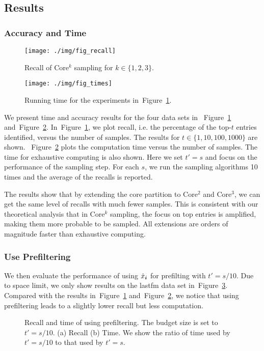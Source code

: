 \documentclass[letterpaper]{article}
\newcommand{\V}[1]{{\boldsymbol{{\MakeLowercase{#1}}}}}
\newcommand{\predx}{\hat{x}_{\V{i}}}
\newcommand{\Fig}[1]{Figure~\ref{fig:#1}}
\begin{document}
\subsection{Results}
\subsubsection{Accuracy and Time}

\begin{figure}[!]
  \centering
  \texttt{[image: ./img/fig\_recall]}\\
  \caption{Recall of Core$^k$ sampling for $k\in\{1,2,3\}$.}
  \label{fig:recall}
\end{figure}
\begin{figure}[!]
    \centering
    \texttt{[image: ./img/fig\_times]}\\
    \caption{Running time for the experiments in~\Fig{recall}.}
    \label{fig:time}
\end{figure}
We present time and accuracy results for the four data sets in 
~\Fig{recall} and~\Fig{time}. 
In~\Fig{recall}, we plot recall, i.e. the percentage of the top-$t$ entries identified, 
versus the number of samples. 
The results for $t\in\{1,10,100,1000\}$ are shown. 
~\Fig{time} plots the computation time versus the number of samples. 
The time for exhaustive computing is also shown. 
Here we set $t'=s$ and focus on the performance of the sampling step. 
For each $s$, we run the sampling algorithms 10 times and the average of the recalls is reported.

The results show that by extending the core partition to Core$^2$ and Core$^3$,
we can get the same level of recalls with much fewer samples.
This is consistent with our theoretical analysis that in Core$^k$ sampling,
the focus on top entries is amplified, 
making them more probable to be sampled. 
All extensions are orders of magnitude faster than exhaustive computing.

\subsubsection{Use Prefiltering}
We then evaluate the performance of using $\predx$ for prefilting with $t'=s/10$. 
Due to space limit, we only show results on the lastfm data set in~\Fig{lastfm_budget}. 
Compared with the results in~\Fig{recall} and~\Fig{time},
we notice that using prefiltering leads to a slightly lower recall but less computation.
\begin{figure}[H]
    \centering   
\caption{Recall and time of using prefiltering. 
        The budget size is set to $t'=s/10$. (a) Recall (b) Time. 
        We show the ratio of time used by $t'=s/10$ to that used by $t'=s$.}
\label{fig:lastfm_budget}    
\end{figure}
\end{document}
